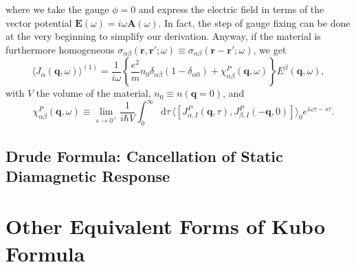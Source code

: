 \documentclass[10pt,nofootinbib,letterpaper]{revtex4}
\newcommand*\dd{\mathop{}\!\mathrm{d}}
\begin{document}
		where we take the gauge $\phi=0$ and express the electric field in terms of the vector potential $\bm{E}(\omega)=i\omega\bm{A}(\omega)$. In fact, the step of gauge fixing can be done at the very beginning to simplify our derivation. Anyway, if the material is furthermore homogeneous $\sigma_{\alpha\beta}(\bm{r},\bm{r'};\omega)\equiv\sigma_{\alpha\beta}(\bm{r}-\bm{r'};\omega)$, we get
		\begin{equation}\label{1.3.9}
			\langle J_\alpha(\bm{q},\omega)\rangle^{(1)}=\dfrac{1}{i\omega}\left\{\dfrac{e^2}{m}n_0\delta_{\alpha\beta}(1-\delta_{\alpha0})+\chi^P_{\alpha\beta}(\bm{q},\omega)\right\}E^\beta(\bm{q},\omega),
		\end{equation}
		with $V$ the volume of the material, $n_0\equiv n(\bm{q}=0)$, and
		\begin{equation}\label{1.3.10}
			\quad\chi_{\alpha\beta}^P(\bm{q},\omega)\equiv\lim_{s\rightarrow0^+}\dfrac{1}{i\hbar V}\int_0^\infty\dd\tau\,\langle[J^P_{\alpha,I}(\bm{q},\tau),J^P_{\beta,I}(-\bm{q},0)]\rangle_0 e^{i\omega\tau-s\tau}.
		\end{equation}
	
	\subsection{Drude Formula: Cancellation of Static Diamagnetic Response}


\section{Other Equivalent Forms of Kubo Formula}
\end{document}

